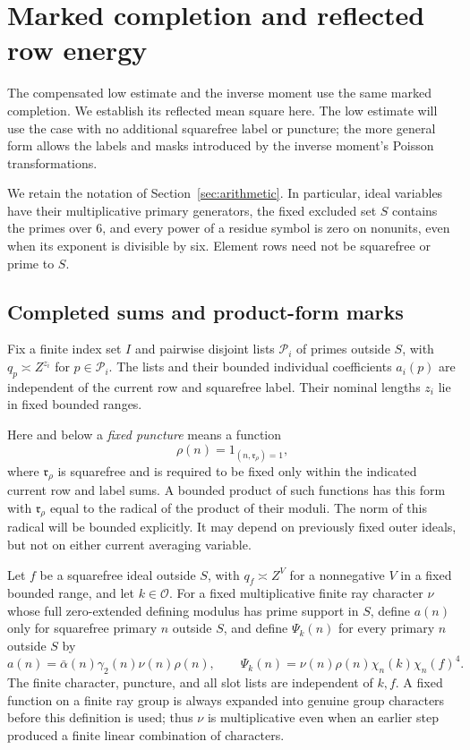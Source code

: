\documentclass[11pt,a4paper]{article}
\numberwithin{equation}{section}
\numberwithin{figure}{section}
\theoremstyle{definition}
\theoremstyle{remark}
\begin{document}
\section{Marked completion and reflected row energy}
\label{sec:marked}\label{sec:marked-energy}

The compensated low estimate and the inverse moment use the same marked
completion. We establish its reflected mean square here. The low estimate
will use the case with no additional squarefree label or puncture; the
more general form allows the labels and masks introduced by the inverse
moment's Poisson transformations.

We retain the notation of Section~\ref{sec:arithmetic}.  In particular,
ideal variables have their multiplicative primary generators, the fixed
excluded set \(S\) contains the primes over \(6\), and every power of a
residue symbol is zero on nonunits, even when its exponent is divisible by
six.  Element rows need not be squarefree or prime to \(S\).

\subsection{Completed sums and product-form marks}

Fix a finite index set \(I\) and pairwise disjoint lists
\(\mathcal P_i\) of primes outside \(S\), with
\(q_p\asymp Z^{z_i}\) for \(p\in\mathcal P_i\). The lists and their
bounded individual coefficients \(a_i(p)\) are independent of the
current row and squarefree label. Their nominal lengths \(z_i\) lie in
fixed bounded ranges.

Here and below a \emph{fixed puncture} means a function
\[
 \rho(n)=1_{(n,\mathfrak r_\rho)=1},
\]
where \(\mathfrak r_\rho\) is squarefree and is required to be fixed only
within the indicated current row and label sums.  A bounded product of such
functions has this form with \(\mathfrak r_\rho\) equal to the radical of
the product of their moduli.  The norm of this radical will be bounded
explicitly.  It
may depend on previously fixed outer ideals, but not on either current
averaging variable.

Let \(f\) be a squarefree ideal outside \(S\), with
\(q_f\asymp Z^V\) for a nonnegative \(V\) in a fixed bounded range,
and let \(k\in\mathcal O\).
For a fixed multiplicative finite ray character \(\nu\) whose full
zero-extended defining modulus has prime support in \(S\), define \(a(n)\)
only for squarefree primary \(n\) outside \(S\), and define \(\Psi_k(n)\)
for every primary \(n\) outside \(S\) by
\[
 a(n)=\bar\alpha(n)\gamma_2(n)\nu(n)\rho(n),\qquad
 \Psi_k(n)=\nu(n)\rho(n)\chi_n(k)\chi_n(f)^4.
\]
The finite character, puncture, and all slot lists are independent of
\(k,f\).  A fixed function on a finite ray group is always expanded into
genuine group characters before this definition is used; thus \(\nu\) is
multiplicative even when an earlier step produced a finite linear
combination of characters.
\end{document}

